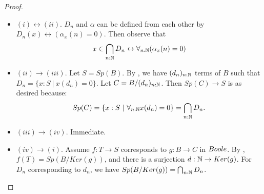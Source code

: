 \begin{proof}
\item 
  \begin{itemize}
  \item 
    $(i)\leftrightarrow (ii)$. $D_n$ and $\alpha$ can be defined from each other by 
     $D_n(x) \leftrightarrow (\alpha_x(n) = 0)$. Then observe that
     \begin{equation}
     x\in \bigcap_{n:\mathbb{N}} D_n \leftrightarrow 
      \forall_{n:\mathbb N} (\alpha_x(n) = 0) 
     \end{equation}
   \item $(ii) \to (iii)$. Let $S=Sp(B)$. 
      By , we have $(d_n)_{n:\mathbb{N}}$ terms of $B$ such that $D_n = \{x:S\ |\ x(d_n) = 0\}$. 
      Let $C = B/(d_n)_{n:\mathbb{N}}$.
      Then $Sp(C) \to S$ is as desired because:
      $$Sp(C) = \{x:S\ |\ \forall_{n:\N} x(d_n) =0\}  = \bigcap_{n:\N} D_n.$$
   \item $(iii) \to (iv)$. Immediate.
   \item $(iv) \to (i)$. Assume $f:T\to S$ corresponds to $g:B\to C$ in $\Boole$. 
     By , $f(T) = Sp(B/Ker(g))$, and 
     there is a surjection $d:\mathbb{N}\to Ker(g)$. 
     For $D_n$ corresponding to $d_n$, we have $Sp(B/Ker(g)) = \bigcap_{n:\mathbb{N}} D_n$. 
%
%
%

\end{itemize}
\end{proof}
